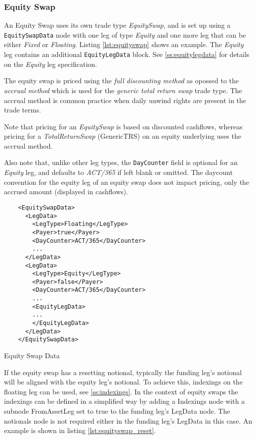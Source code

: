 \subsubsection{Equity Swap}
\label{ss:equity_swap}

An Equity Swap uses its own trade type  \emph{EquitySwap}, and is set up using a {\tt EquitySwapData} node with one leg of type  \emph{Equity} and one more leg that can be either \emph{Fixed} or  \emph{Floating}. Listing \ref{lst:equityswap} shows an example. The
\emph{Equity} leg contains an additional {\tt EquityLegData} block. See \ref{ss:equitylegdata} for details on the \emph{Equity} leg specification.

The equity swap is priced using the {\em full discounting method} as opossed to the {\em accrual method} which is used
for the {\em generic total return swap} trade type. The accrual method is common practice when daily unwind rights are
present in the trade terms.

Note that pricing for an \emph{EquitySwap} is based on discounted cashflows, whereas pricing for a \emph{TotalReturnSwap} (GenericTRS) on an equity underlying uses the accrual method.

Also note that, unlike other leg types, the {\tt DayCounter} field is optional for an \emph{Equity} leg, and defaults to \emph{ACT/365} if left blank or omitted. The daycount convention for the equity leg of an equity swap does not impact pricing, only the accrued amount (displayed in cashflows).


\begin{listing}[H]
\begin{verbatim}
    <EquitySwapData>
      <LegData>
        <LegType>Floating</LegType>
        <Payer>true</Payer>
        <DayCounter>ACT/365</DayCounter>
        ...
      </LegData>
      <LegData>
        <LegType>Equity</LegType>
        <Payer>false</Payer>
        <DayCounter>ACT/365</DayCounter>
        ...
        <EquityLegData>
        ...
        </EquityLegData>
      </LegData>
    </EquitySwapData>
\end{verbatim}
\caption{Equity Swap Data}
\label{lst:equityswap}
\end{listing}

If the equity swap has a resetting notional, typically the funding leg's notional will be aligned with the equity leg's
notional. To achieve this, indexings on the floating leg can be used, see \ref{ss:indexings}. In the context of equity
swaps the indexings can be defined in a simplified way by adding a Indexings node with a subnode FromAssetLeg set to
true to the funding leg's LegData node. The notionals node is not required either in the funding leg's LegData in this
case. An example is shown in listing \ref{lst:equityswap_reset}.

